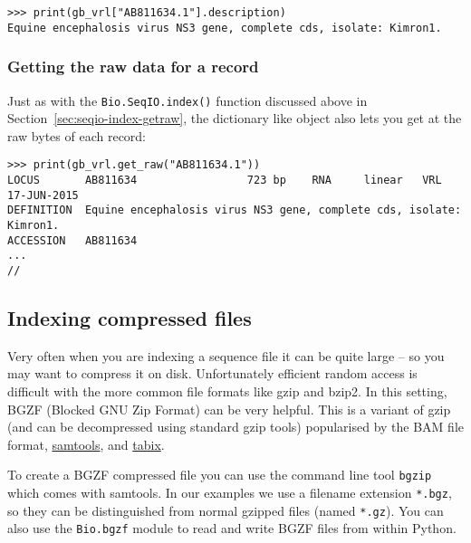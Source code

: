 \begin{verbatim}
>>> print(gb_vrl["AB811634.1"].description)
Equine encephalosis virus NS3 gene, complete cds, isolate: Kimron1.
\end{verbatim}

\subsubsection{Getting the raw data for a record}

Just as with the \verb|Bio.SeqIO.index()| function discussed above in
Section~\ref{sec:seqio-index-getraw}, the dictionary like object also lets you
get at the raw bytes of each record:

%
\begin{verbatim}
>>> print(gb_vrl.get_raw("AB811634.1"))
LOCUS       AB811634                 723 bp    RNA     linear   VRL 17-JUN-2015
DEFINITION  Equine encephalosis virus NS3 gene, complete cds, isolate: Kimron1.
ACCESSION   AB811634
...
//
\end{verbatim}

\subsection{Indexing compressed files}
\label{sec:SeqIO-index-bgzf}

Very often when you are indexing a sequence file it can be quite large -- so
you may want to compress it on disk. Unfortunately efficient random access
is difficult with the more common file formats like gzip and bzip2. In this
setting, BGZF (Blocked GNU Zip Format) can be very helpful. This is a variant
of gzip (and can be decompressed using standard gzip tools) popularised by
the BAM file format, \href{https://www.htslib.org/}{samtools}, and
\href{https://www.htslib.org/doc/tabix.html}{tabix}.

To create a BGZF compressed file you can use the command line tool \verb|bgzip|
which comes with samtools. In our examples we use a filename extension
\verb|*.bgz|, so they can be distinguished from normal gzipped files (named
\verb|*.gz|). You can also use the \verb|Bio.bgzf| module to read and write
BGZF files from within Python.


